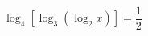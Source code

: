 \begin{ex}[type=equation]
	\begin{condition}
		$\log_4 [ \log_3(\log_2 x)] = \dfrac{1}{2}$
	\end{condition}
\end{ex}